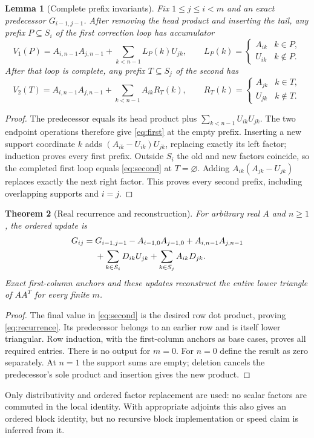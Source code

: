 \documentclass[10pt,a4paper]{article}
\newtheorem{theorem}{Theorem}
\newtheorem{lemma}[theorem]{Lemma}
\begin{document}
\begin{lemma}[Complete prefix invariants]\label{lem:prefix}
Fix $1\le j\le i<m$ and an exact predecessor $G_{i-1,j-1}$. After removing
the head product and inserting the tail, any prefix $P\subseteq S_i$ of the
first correction loop has accumulator
\begin{equation}\label{eq:first}
 V_1(P)=A_{i,n-1}A_{j,n-1}+\sum_{k<n-1}L_P(k)U_{jk},\qquad
 L_P(k)=\begin{cases}A_{ik}&k\in P,\\U_{ik}&k\notin P.\end{cases}
\end{equation}
After that loop is complete, any prefix $T\subseteq S_j$ of the second has
\begin{equation}\label{eq:second}
 V_2(T)=A_{i,n-1}A_{j,n-1}+\sum_{k<n-1}A_{ik}R_T(k),\qquad
 R_T(k)=\begin{cases}A_{jk}&k\in T,\\U_{jk}&k\notin T.\end{cases}
\end{equation}
\end{lemma}
\begin{proof}
The predecessor equals its head product plus
$\sum_{k<n-1}U_{ik}U_{jk}$. The two endpoint operations therefore give
\eqref{eq:first} at the empty prefix. Inserting a new support coordinate $k$
adds $(A_{ik}-U_{ik})U_{jk}$, replacing exactly its left factor; induction
proves every first prefix. Outside $S_i$ the old and new factors coincide,
so the completed first loop equals \eqref{eq:second} at $T=\varnothing$.
Adding $A_{ik}(A_{jk}-U_{jk})$ replaces exactly the next right factor.
This proves every second prefix, including overlapping supports and $i=j$.
\end{proof}

\begin{theorem}[Real recurrence and reconstruction]\label{thm:real}
For arbitrary real $A$ and $n\ge1$, the ordered update is
\begin{align}\label{eq:recurrence}
G_{ij}={}&G_{i-1,j-1}-A_{i-1,0}A_{j-1,0}+A_{i,n-1}A_{j,n-1}\notag\\
 &+\sum_{k\in S_i}D_{ik}U_{jk}+\sum_{k\in S_j}A_{ik}D_{jk}.
\end{align}
Exact first-column anchors and these updates reconstruct the entire lower
triangle of $AA^T$ for every finite $m$.
\end{theorem}
\begin{proof}
The final value in \eqref{eq:second} is the desired row dot product, proving
\eqref{eq:recurrence}. Its predecessor belongs to an earlier row and is itself
lower triangular. Row induction, with the first-column anchors as base cases,
proves all required entries. There is no output for $m=0$. For $n=0$ define
the result as zero separately. At $n=1$ the support sums are empty; deletion
cancels the predecessor's sole product and insertion gives the new product.
\end{proof}
Only distributivity and ordered factor replacement are used: no scalar factors
are commuted in the local identity. With appropriate adjoints this also gives
an ordered block identity, but no recursive block implementation or speed claim
is inferred from it.
\end{document}
